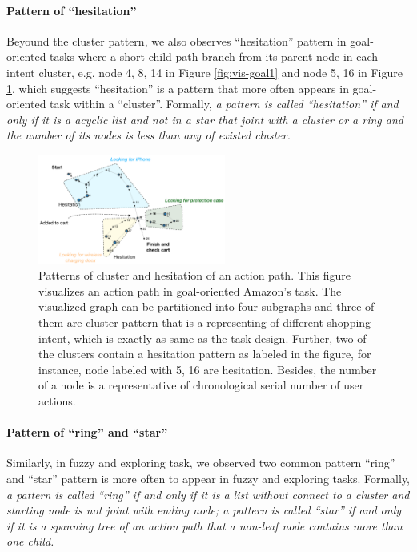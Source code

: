\paragraph{Pattern of ``hesitation''}
Beyound the cluster pattern, we also observes ``hesitation'' pattern in goal-oriented tasks
where a short child path branch from its parent node in each intent cluster, e.g. node
4, 8, 14 in Figure \ref{fig:vis-goal1} and node 5, 16 in Figure \ref{fig:vis-goal2},
which suggests ``hesitation'' is a pattern that more often appears in goal-oriented task
within a ``cluster''. Formally, \emph{a pattern is called ``hesitation'' if and only if it
is a acyclic list and not in a star that joint with a cluster or a ring and the number of its nodes is less than any 
of existed cluster.}

\begin{figure}[H]
    \centering
    \includegraphics[width=0.55\textwidth]{figures/vis-goal2}
    \caption{Patterns of cluster and hesitation of an action path. This figure visualizes an action path in
    goal-oriented Amazon's task. The visualized graph can be partitioned into four subgraphs
    and three of them are cluster pattern that is a representing of different shopping intent, 
    which is exactly as same as the task design. Further, two of the clusters contain a hesitation pattern
    as labeled in the figure, for instance, node labeled with 5, 16 are hesitation. 
    Besides, the number of a node
    is a representative of chronological serial number of user actions.}
    \label{fig:vis-goal2}
\end{figure}

\paragraph{Pattern of ``ring'' and ``star''}
Similarly, in fuzzy and exploring task, we observed two common pattern ``ring'' and ``star''
pattern is more often to appear in fuzzy and exploring tasks.
Formally, \emph{a pattern is called ``ring'' if and only if it is a list without connect to a cluster
and starting node is not joint with ending node; a pattern is called ``star'' if and only if 
it is a spanning tree of an action path that a non-leaf node contains more than one child.}

